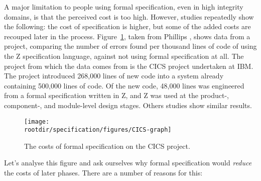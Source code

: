 A major limitation to people using formal specification, even in high integrity domains, is that the perceived cost is too high. However, studies repeatedly show the following: the cost of specification is higher, but some of the added costs are recouped later in the process. Figure~\ref{fig:specification:costs-of-formal-specification}, taken from Phillips \cite{phillips89}, shows data from a project, comparing the number of errors found per thousand lines of code of using the Z specification language, against not using formal specification at all. The project from which the data comes from is the CICS project undertaken at IBM. The project introduced 268,000 lines of new code into a system already containing 500,000 lines of code. Of the new code, 48,000 lines was engineered from a formal specification written in Z, and Z was used at the product-, component-, and module-level design stages. Others studies show similar results.

\begin{figure}[!h]
\centering
\texttt{[image: \\rootdir/specification/figures/CICS-graph]}
\caption{The costs of formal specification on the CICS project.}
\label{fig:specification:costs-of-formal-specification}
\end{figure}

Let's analyse this figure and ask ourselves why formal specification would \emph{reduce} the costs of later phases. There are a number of reasons for this:

